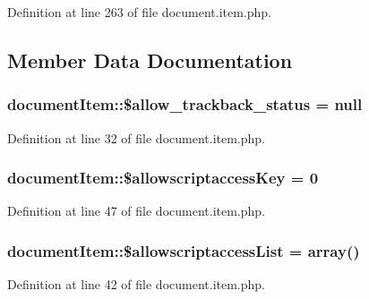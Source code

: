 Definition at line 263 of file document.\-item.\-php.



\subsection{Member Data Documentation}
\hypertarget{classdocumentItem_aaf08d80bedc01fc0fc0370677a4ba9cc}{
\subsubsection[{\$allow\-\_\-trackback\-\_\-status}]{\setlength{\rightskip}{0pt plus 5cm}document\-Item\-::\$allow\-\_\-trackback\-\_\-status = null}}\label{classdocumentItem_aaf08d80bedc01fc0fc0370677a4ba9cc}


Definition at line 32 of file document.\-item.\-php.

\hypertarget{classdocumentItem_ab4273ebe05df985235bf651d918bd4f8}{
\subsubsection[{\$allowscriptaccess\-Key}]{\setlength{\rightskip}{0pt plus 5cm}document\-Item\-::\$allowscriptaccess\-Key = 0}}\label{classdocumentItem_ab4273ebe05df985235bf651d918bd4f8}


Definition at line 47 of file document.\-item.\-php.

\hypertarget{classdocumentItem_a3b10cc840f3a20580d3ab2269ef24df3}{
\subsubsection[{\$allowscriptaccess\-List}]{\setlength{\rightskip}{0pt plus 5cm}document\-Item\-::\$allowscriptaccess\-List = array()}}\label{classdocumentItem_a3b10cc840f3a20580d3ab2269ef24df3}


Definition at line 42 of file document.\-item.\-php.

